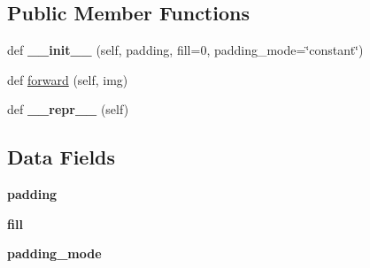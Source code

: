 \subsection*{Public Member Functions}
\begin{DoxyCompactItemize}
\item 
\mbox{\label{classtorchvision_1_1transforms_1_1transforms_1_1Pad_a374f7d20dc33d68899516ce365a81273}} 
def {\bfseries \+\_\+\+\_\+init\+\_\+\+\_\+} (self, padding, fill=0, padding\+\_\+mode=\char`\"{}constant\char`\"{})
\item 
def \hyperlink{classtorchvision_1_1transforms_1_1transforms_1_1Pad_a4155192980ce1513c877c31f84482832}{forward} (self, img)
\item 
\mbox{\label{classtorchvision_1_1transforms_1_1transforms_1_1Pad_a85b3d524bfb5374b704afb2c6286c5de}} 
def {\bfseries \+\_\+\+\_\+repr\+\_\+\+\_\+} (self)
\end{DoxyCompactItemize}
\subsection*{Data Fields}
\begin{DoxyCompactItemize}
\item 
\mbox{\label{classtorchvision_1_1transforms_1_1transforms_1_1Pad_af6c3abcfe61d705c0fe09a0345ef5db2}} 
{\bfseries padding}
\item 
\mbox{\label{classtorchvision_1_1transforms_1_1transforms_1_1Pad_a4cf479e25f08eddc7a6c571dd6418567}} 
{\bfseries fill}
\item 
\mbox{\label{classtorchvision_1_1transforms_1_1transforms_1_1Pad_abbf2912fd7639cb7e87aa89541023524}} 
{\bfseries padding\+\_\+mode}
\end{DoxyCompactItemize}


